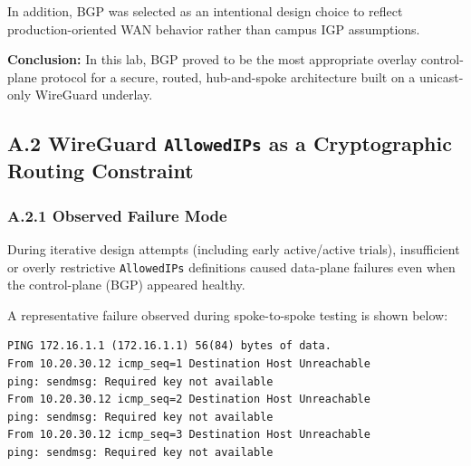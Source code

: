 \documentclass[11pt]{article}
\begin{document}
In addition, BGP was selected as an intentional design choice to reflect production-oriented WAN behavior rather than campus IGP assumptions.

\textbf{Conclusion:} In this lab, BGP proved to be the most appropriate overlay control-plane protocol for a secure, routed, hub-and-spoke architecture built on a unicast-only WireGuard underlay.

%
%
%
\subsection{A.2 WireGuard \texttt{AllowedIPs} as a Cryptographic Routing Constraint}
\label{subsec:a2-allowedips-constraint}

\subsubsection{A.2.1 Observed Failure Mode}
\label{subsubsec:a2-observed-failure}

During iterative design attempts (including early active/active trials), insufficient or overly restrictive \texttt{AllowedIPs} definitions caused data-plane failures even when the control-plane (BGP) appeared healthy.

A representative failure observed during spoke-to-spoke testing is shown below:

\begin{verbatim}
PING 172.16.1.1 (172.16.1.1) 56(84) bytes of data.
From 10.20.30.12 icmp_seq=1 Destination Host Unreachable
ping: sendmsg: Required key not available
From 10.20.30.12 icmp_seq=2 Destination Host Unreachable
ping: sendmsg: Required key not available
From 10.20.30.12 icmp_seq=3 Destination Host Unreachable
ping: sendmsg: Required key not available
\end{verbatim}
\end{document}
